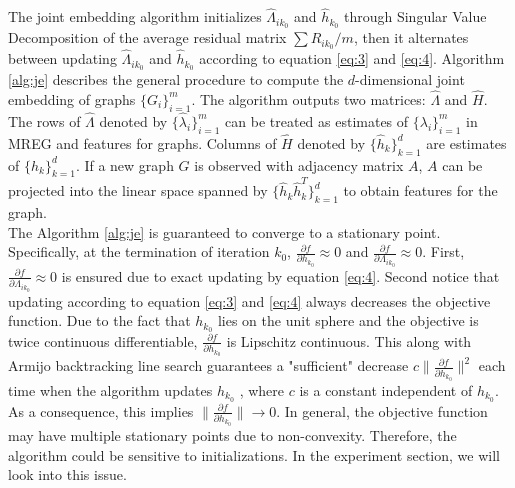 \documentclass[10pt,journal,compsoc]{IEEEtran}
\begin{document}
\noindent The joint embedding algorithm initializes $\hat{\Lambda}_{i k_0}$ and $\hat {h}_{k_0}$ through Singular Value Decomposition of the average residual matrix $\sum R_{ik_0}/m$, then it alternates between updating $\hat{\Lambda}_{i k_0}$ and $\hat {h}_{k_0}$ according to equation \eqref{eq:3} and \eqref{eq:4}.  Algorithm \ref{alg:je} describes the general procedure to compute the $d$-dimensional joint embedding of graphs $\{G_i\}_{i=1}^m$. The algorithm outputs two matrices: $\hat{\Lambda}$ and $\hat{H}$. The rows of $\hat{\Lambda}$ denoted by $\{\hat{\lambda}_i\}_{i=1}^m$ can be treated as estimates of $\{\lambda_i\}_{i=1}^m$ in MREG and features for graphs. Columns of $\hat{H}$ denoted by $\{\hat{h}_k\}_{k=1}^d$ are estimates of $\{h_k\}_{k=1}^d$. If a new graph $G$ is observed with adjacency matrix $A$, $A$ can be projected into the linear space spanned by $\{\hat{h}_k \hat{h}_k^T\}_{k=1}^{d}$ to obtain features for the graph. \\

\noindent The Algorithm \ref{alg:je} is guaranteed to converge to a stationary point. Specifically, at the termination of iteration $k_0$, $\frac{\partial f}{\partial h_{k_0}} \approx 0$ and $\frac{\partial f}{\partial \Lambda_{i k_0}} \approx 0$. First, $\frac{\partial f}{\partial \Lambda_{i k_0}} \approx 0$ is ensured due to exact updating by equation \eqref{eq:4}. Second notice that updating according to equation \eqref{eq:3} and \eqref{eq:4} always decreases the objective function. Due to the fact that $h_{k_0}$ lies on the unit sphere and the objective is twice continuous differentiable, $\frac{\partial f}{\partial h_{k_0}}$ is Lipschitz continuous. This along with Armijo backtracking line search guarantees a "sufficient" decrease $c\|\frac{\partial f}{\partial h_{k_0}}\|^2$ each time when the algorithm updates $h_{k_0}$ \cite{nocedal2006numerical}, where $c$ is a constant independent of $h_{k_0}$. As a consequence, this implies $\|\frac{\partial f}{\partial h_{k_0}}\| \rightarrow 0$. In general, the objective function may have multiple stationary points due to non-convexity. Therefore, the algorithm could be sensitive to initializations. In the experiment section, we will look into this issue.\\
\end{document}
